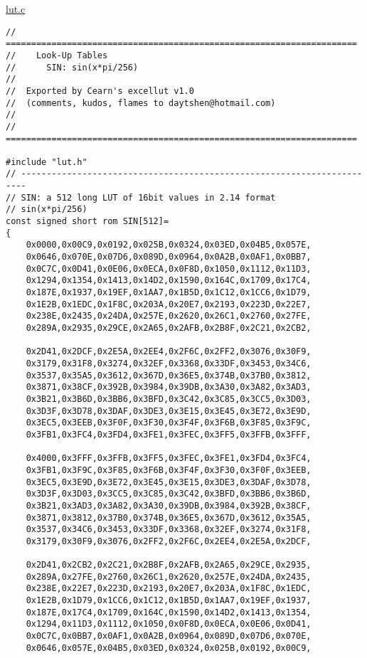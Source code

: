 \underline{lut.c}
\begin{lstlisting}
// =====================================================================
//	  Look-Up Tables
//		SIN: sin(x*pi/256)
//
//	Exported by Cearn's excellut v1.0
//	(comments, kudos, flames to daytshen@hotmail.com)
//
// =====================================================================

#include "lut.h"
// -----------------------------------------------------------------------
// SIN: a 512 long LUT of 16bit values in 2.14 format
// sin(x*pi/256)
const signed short rom SIN[512]=
{
	0x0000,0x00C9,0x0192,0x025B,0x0324,0x03ED,0x04B5,0x057E,
	0x0646,0x070E,0x07D6,0x089D,0x0964,0x0A2B,0x0AF1,0x0BB7,
	0x0C7C,0x0D41,0x0E06,0x0ECA,0x0F8D,0x1050,0x1112,0x11D3,
	0x1294,0x1354,0x1413,0x14D2,0x1590,0x164C,0x1709,0x17C4,
	0x187E,0x1937,0x19EF,0x1AA7,0x1B5D,0x1C12,0x1CC6,0x1D79,
	0x1E2B,0x1EDC,0x1F8C,0x203A,0x20E7,0x2193,0x223D,0x22E7,
	0x238E,0x2435,0x24DA,0x257E,0x2620,0x26C1,0x2760,0x27FE,
	0x289A,0x2935,0x29CE,0x2A65,0x2AFB,0x2B8F,0x2C21,0x2CB2,

	0x2D41,0x2DCF,0x2E5A,0x2EE4,0x2F6C,0x2FF2,0x3076,0x30F9,
	0x3179,0x31F8,0x3274,0x32EF,0x3368,0x33DF,0x3453,0x34C6,
	0x3537,0x35A5,0x3612,0x367D,0x36E5,0x374B,0x37B0,0x3812,
	0x3871,0x38CF,0x392B,0x3984,0x39DB,0x3A30,0x3A82,0x3AD3,
	0x3B21,0x3B6D,0x3BB6,0x3BFD,0x3C42,0x3C85,0x3CC5,0x3D03,
	0x3D3F,0x3D78,0x3DAF,0x3DE3,0x3E15,0x3E45,0x3E72,0x3E9D,
	0x3EC5,0x3EEB,0x3F0F,0x3F30,0x3F4F,0x3F6B,0x3F85,0x3F9C,
	0x3FB1,0x3FC4,0x3FD4,0x3FE1,0x3FEC,0x3FF5,0x3FFB,0x3FFF,

	0x4000,0x3FFF,0x3FFB,0x3FF5,0x3FEC,0x3FE1,0x3FD4,0x3FC4,
	0x3FB1,0x3F9C,0x3F85,0x3F6B,0x3F4F,0x3F30,0x3F0F,0x3EEB,
	0x3EC5,0x3E9D,0x3E72,0x3E45,0x3E15,0x3DE3,0x3DAF,0x3D78,
	0x3D3F,0x3D03,0x3CC5,0x3C85,0x3C42,0x3BFD,0x3BB6,0x3B6D,
	0x3B21,0x3AD3,0x3A82,0x3A30,0x39DB,0x3984,0x392B,0x38CF,
	0x3871,0x3812,0x37B0,0x374B,0x36E5,0x367D,0x3612,0x35A5,
	0x3537,0x34C6,0x3453,0x33DF,0x3368,0x32EF,0x3274,0x31F8,
	0x3179,0x30F9,0x3076,0x2FF2,0x2F6C,0x2EE4,0x2E5A,0x2DCF,

	0x2D41,0x2CB2,0x2C21,0x2B8F,0x2AFB,0x2A65,0x29CE,0x2935,
	0x289A,0x27FE,0x2760,0x26C1,0x2620,0x257E,0x24DA,0x2435,
	0x238E,0x22E7,0x223D,0x2193,0x20E7,0x203A,0x1F8C,0x1EDC,
	0x1E2B,0x1D79,0x1CC6,0x1C12,0x1B5D,0x1AA7,0x19EF,0x1937,
	0x187E,0x17C4,0x1709,0x164C,0x1590,0x14D2,0x1413,0x1354,
	0x1294,0x11D3,0x1112,0x1050,0x0F8D,0x0ECA,0x0E06,0x0D41,
	0x0C7C,0x0BB7,0x0AF1,0x0A2B,0x0964,0x089D,0x07D6,0x070E,
	0x0646,0x057E,0x04B5,0x03ED,0x0324,0x025B,0x0192,0x00C9,


\end{lstlisting}
